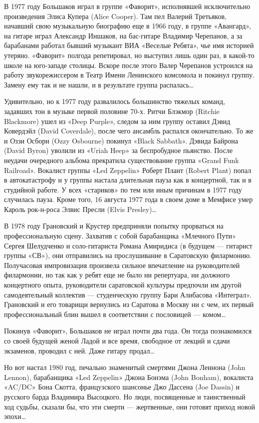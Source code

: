 \documentclass[16pt,a5paper,oneside]{book}
\begin{document}
В 1977 году Большаков играл в группе «Фаворит», исполнявшей исключительно произведения Элиса Купера (Alice Cooper). Там
пел Валерий Третьяков, начавший свою музыкальную биографию еще в 1966 году, в группе «Авангард», на гитаре играл
Александр Иншаков, на бас-гитаре Владимир Черепанов, а за барабанами работал бывший музыкант ВИА «Веселые Ребята», чье
имя историей утеряно. «Фаворит» полгода репетировал, но выступил лишь один раз, в какой-то школе на юго-западе столицы.
Вскоре после этого Валер Черепанов устроился на работу звукорежиссером в Театр Имени Ленинского комсомола и покинул
группу. Замену ему так и не нашли, и в результате группа распалась\ldots

Удивительно, но к 1977 году развалилось большинство тяжелых команд, задавших тон в музыке первой половине 70-х.
Ритчи Блэкмор (Ritchie Blackmore) ушел из «Deep Purple», следом за ним группу оставил Дэвид Ковердэйл (David Coverdale),
после чего ансамбль распался окончательно. То же и Оззи Осборн (Ozzy Osbourne) покинул «Black Sabbath». Дэвида Байрона
(David Byron) уволили из «Uriah Heep» за беспробудное пьянство. После неудачи очередного альбома прекратила
существование группа «Grand Funk Railroad». Вокалист группы «Led Zeppelin» Роберт Плант (Robert Plant) попал в
автокатастрофу и у группы настала длительная пауза как в концертной, так и в студийной работе. У всех «стариков» по тем
или иным причинам в 1977 году случилась пауза. Кроме того, 16 августа 1977 года в своем доме в Мемфисе умер Кароль
рок-н-роса Элвис Пресли (Elvis Presley)\ldots

В 1978 году Грановский и Крустер предприняли попытку прорваться на профессиональную сцену. Захватив с собой барабанщика
«Млечного Пути» Сергея Шелудченко и соло-гитариста Романа Амиридиса (в будущем — гитарист группы «СВ»), они отправились
на прослушивание в Саратовскую филармонию. Получасовая импровизация произвела сильное впечатление на руководителей
филармонии, но так как у ребят еще не было ни репертуара, ни должного концертного опыта, руководители саратовской
культуры предпочли им другой самодеятельный коллектив — студенческую группу Бари Алибасова «Интеграл». Грановский и его
товарищи вернулись из Саратова в Москву ни с чем, их первый профессиональный блин вышел в соответствии с пословицей —
комом\ldots

Покинув «Фаворит», Большаков не играл почти два года. Он тогда познакомился со своей будущей женой Ладой и все время,
свободное от лекций и сдачи экзаменов, проводил с ней. Даже гитару продал\ldots

Но вот настал 1980 год, печально знаменитый смертями Джона Леннона (John Lennon), барабанщика «Led Zeppelin» Джона
Бонэма (John Bonham), вокалиста «AC/DC» Бона Скотта, французского шансонье Джо Дассена (Joe Dassin) и русского барда
Владимира Высоцкого. Но люди, посвященные и таинственный ход судьбы, сказали бы, что эти смерти — жертвенные, они
готовят приход новой эпохи\ldots
\end{document}
